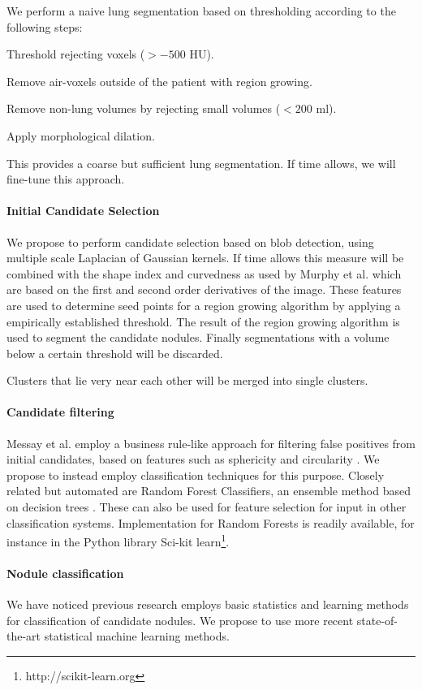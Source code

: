 \documentclass[a4paper, 10pt, english, onecolumn]{article}
\newenvironment{packed_enum}{
\begin{enumerate}
  \setlength{\itemsep}{1pt}
  \setlength{\parskip}{0pt}
  \setlength{\parsep}{0pt}
}{\end{enumerate}}
\begin{document}
We perform a naive lung segmentation based on thresholding according to the following steps:
\begin{packed_enum}
\item Threshold rejecting voxels ($> -500$ HU).
\item Remove air-voxels outside of the patient with region growing.
\item Remove non-lung volumes by rejecting small volumes ($< 200$ ml).
\item Apply morphological dilation.
\end{packed_enum}
This provides a coarse but sufficient lung segmentation.
If time allows, we will fine-tune this approach.

\paragraph{Initial Candidate Selection}
We propose to perform candidate selection based on blob detection, using multiple scale Laplacian of Gaussian kernels.
If time allows this measure will be combined with the shape index and curvedness as used by Murphy et al. \cite{murphy2009large} which are based on the first and second order derivatives of the image.
These features are used to determine seed points for a region growing algorithm by applying a empirically established threshold.
The result of the region growing algorithm is used to segment the candidate nodules.
Finally segmentations with a volume below a certain threshold will be discarded.

Clusters that lie very near each other will be merged into single clusters.

\paragraph{Candidate filtering}
Messay et al. employ a business rule-like approach for filtering false positives from initial candidates, based on features such as sphericity and circularity \cite{messay2010new}.
We propose to instead employ classification techniques for this purpose.
Closely related but automated are Random Forest Classifiers, an ensemble method based on decision trees \cite{breiman2001random}.
These can also be used for feature selection for input in other classification systems.
Implementation for Random Forests is readily available, for instance in the Python library Sci-kit learn\footnote{http://scikit-learn.org}.

\paragraph{Nodule classification}
We have noticed previous research employs basic statistics and learning methods for classification of candidate nodules.
We propose to use more recent state-of-the-art statistical machine learning methods.
\end{document}
